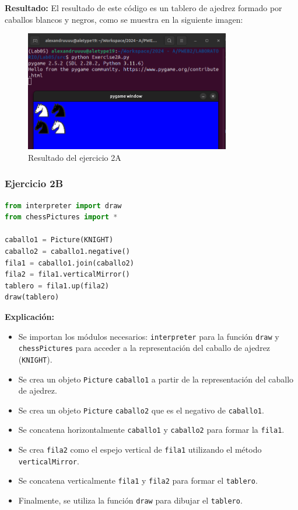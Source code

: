 \documentclass{article}
\begin{document}
\begin{itemize}
\textbf{Resultado:}
El resultado de este código es un tablero de ajedrez formado por caballos blancos y negros, como se muestra en la siguiente imagen:

\begin{figure}[H]
    \centering
    \includegraphics[width=0.8\textwidth]{img/1.png}
    \caption{Resultado del ejercicio 2A}
    \label{fig:ejercicio2a}
\end{figure}

\subsubsection{Ejercicio 2B}

\begin{lstlisting}[language=Python, caption={Código del ejercicio 2B}]
from interpreter import draw
from chessPictures import *

caballo1 = Picture(KNIGHT)
caballo2 = caballo1.negative()
fila1 = caballo1.join(caballo2)
fila2 = fila1.verticalMirror()
tablero = fila1.up(fila2)
draw(tablero)
\end{lstlisting}

\textbf{Explicación:}
\begin{itemize}
    \item Se importan los módulos necesarios: \texttt{interpreter} para la función \texttt{draw} y \texttt{chessPictures} para acceder a la representación del caballo de ajedrez (\texttt{KNIGHT}).
    \item Se crea un objeto \texttt{Picture} \texttt{caballo1} a partir de la representación del caballo de ajedrez.
    \item Se crea un objeto \texttt{Picture} \texttt{caballo2} que es el negativo de \texttt{caballo1}.
    \item Se concatena horizontalmente \texttt{caballo1} y \texttt{caballo2} para formar la \texttt{fila1}.
    \item Se crea \texttt{fila2} como el espejo vertical de \texttt{fila1} utilizando el método \texttt{verticalMirror}.
    \item Se concatena verticalmente \texttt{fila1} y \texttt{fila2} para formar el \texttt{tablero}.
    \item Finalmente, se utiliza la función \texttt{draw} para dibujar el \texttt{tablero}.
\end{itemize}


\end{itemize}
\end{document}
